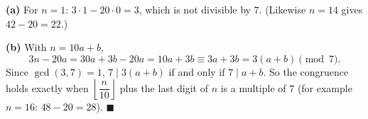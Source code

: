 \textbf{(a)} For $n=1$: $3\cdot1-20\cdot0=3$, which is not divisible by $7$. (Likewise $n=14$ gives $42-20=22$.)

\textbf{(b)} With $n=10a+b$,
\[3n-20a=30a+3b-20a=10a+3b\equiv3a+3b=3(a+b)\pmod7.\]
Since $\gcd(3,7)=1$, $7\mid3(a+b)$ if and only if $7\mid a+b$. So the congruence holds exactly when $\left\lfloor\dfrac n{10}\right\rfloor$ plus the last digit of $n$ is a multiple of $7$ (for example $n=16$: $48-20=28$). $\blacksquare$
